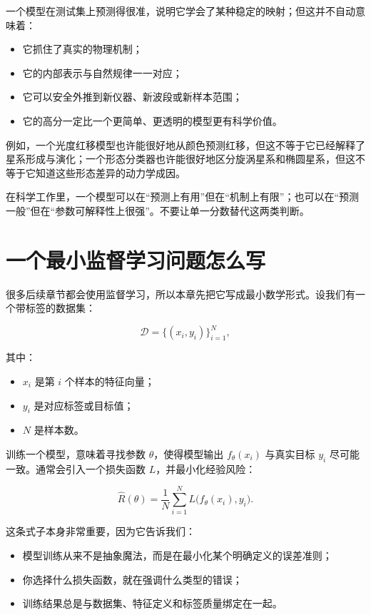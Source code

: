 一个模型在测试集上预测得很准，说明它学会了某种稳定的映射；但这并不自动意味着：

\begin{itemize}
    \item 它抓住了真实的物理机制；
    \item 它的内部表示与自然规律一一对应；
    \item 它可以安全外推到新仪器、新波段或新样本范围；
    \item 它的高分一定比一个更简单、更透明的模型更有科学价值。
\end{itemize}

例如，一个光度红移模型也许能很好地从颜色预测红移，但这不等于它已经解释了星系形成与演化；一个形态分类器也许能很好地区分旋涡星系和椭圆星系，但这不等于它知道这些形态差异的动力学成因。

\begin{protip}[预测能力与机制解释要分开讨论]
在科学工作里，一个模型可以在“预测上有用”但在“机制上有限”；也可以在“预测一般”但在“参数可解释性上很强”。不要让单一分数替代这两类判断。
\end{protip}

\section{一个最小监督学习问题怎么写}

很多后续章节都会使用监督学习，所以本章先把它写成最小数学形式。设我们有一个带标签的数据集：

\[
\mathcal{D} = \{(x_i, y_i)\}_{i=1}^{N},
\]

其中：

\begin{itemize}
    \item $x_i$ 是第 $i$ 个样本的特征向量；
    \item $y_i$ 是对应标签或目标值；
    \item $N$ 是样本数。
\end{itemize}

训练一个模型，意味着寻找参数 $\theta$，使得模型输出 $f_\theta(x_i)$ 与真实目标 $y_i$ 尽可能一致。通常会引入一个损失函数 $L$，并最小化经验风险：

\[
\hat{R}(\theta) = \frac{1}{N}\sum_{i=1}^{N} L\bigl(f_\theta(x_i), y_i\bigr).
\]

这条式子本身非常重要，因为它告诉我们：

\begin{itemize}
    \item 模型训练从来不是抽象魔法，而是在最小化某个明确定义的误差准则；
    \item 你选择什么损失函数，就在强调什么类型的错误；
    \item 训练结果总是与数据集、特征定义和标签质量绑定在一起。
\end{itemize}

